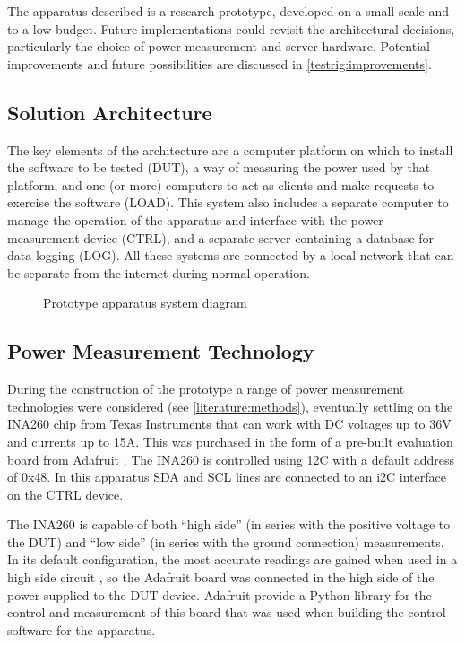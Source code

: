 The apparatus described is a research prototype, developed on a small scale and to a low budget. Future implementations could revisit the architectural decisions, particularly the choice of power measurement and server hardware. Potential improvements and future possibilities are discussed in \autoref{testrig:improvements}.

\subsection{Solution Architecture}

The key elements of the architecture are a computer platform on which to install the software to be tested (DUT), a way of measuring the power used by that platform, and one (or more) computers to act as clients and make requests to exercise the software (LOAD). This system also includes a separate computer to manage the operation of the apparatus and interface with the power measurement device (CTRL), and a separate server containing a database for data logging (LOG). All these systems are connected by a local network that can be separate from the internet during normal operation.

\begin{figure}[htbp]
  \centering
  
  \caption{Prototype apparatus system diagram}
\end{figure}

\subsection{Power Measurement Technology}
\label{Power measurement}

During the construction of the prototype a range of power measurement technologies were considered (see \autoref{literature:methods}), eventually settling on the INA260 chip from Texas Instruments \citep{TexasInstruments2016} that can work with DC voltages up to 36V and currents up to 15A. This was purchased in the form of a pre-built evaluation board from Adafruit \citep{AdafruitINA260}. The INA260 is controlled using 12C with a default address of 0x48. In this apparatus SDA and SCL lines are connected to an i2C interface on the CTRL device.

The INA260 is capable of both \enquote{high side} (in series with the positive voltage to the DUT) and \enquote{low side} (in series with the ground connection) measurements. In its  default configuration, the most accurate readings are gained when used in a high side circuit \citep{TexasInstruments2016}, so the Adafruit board was connected in the high side of the power supplied to the DUT device. Adafruit provide a Python library for the control and measurement of this board that was used when building the control software for the apparatus.

